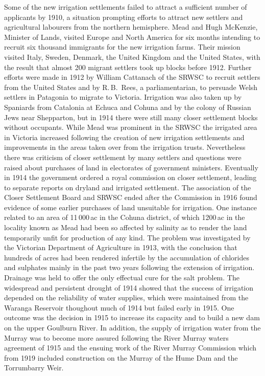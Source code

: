 Some of the new irrigation settlements failed to attract a sufficient
number of applicants by 1910, a situation prompting efforts to attract
new settlers and agricultural labourers from the northern hemisphere.
Mead and Hugh McKenzie, Minister of Lands, visited Europe and North
America for six months intending to recruit six thousand immigrants
for the new irrigation farms. Their mission visited Italy, Sweden,
Denmark, the United Kingdom and the United States, with the result
that almost 200 migrant settlers took up blocks before 1912.  Further
efforts were made in 1912 by William Cattanach of the SRWSC to recruit
settlers from the United States and by R.\,B.~Rees, a parliamentarian,
to persuade Welsh settlers in Patagonia to migrate to Victoria.
Irrigation was also taken up by Spaniards from Catalonia at Echuca and
Cohuna and by the colony of Russian Jews near Shepparton, but in 1914
there were still many closer settlement blocks without occupants.
While Mead was prominent in the SRWSC the irrigated area in Victoria
increased following the creation of new irrigation settlements and
improvements in the areas taken over from the irrigation trusts.
Nevertheless there was criticism of closer settlement by many settlers
and questions were raised about purchases of land in electorates of
government ministers.  Eventually in 1914 the government ordered a
royal commission on closer settlement, leading to separate reports on
dryland and irrigated settlement.  The association of the Closer
Settlement Board and SRWSC ended after the Commission in 1916 found
evidence of some earlier purchases of land unsuitable for irrigation.
One instance related to an area of 11\,000\,ac in the Cohuna district,
of which 1200\,ac in the locality known as Mead had been so affected
by salinity as to render the land temporarily unfit for production of
any kind.  The problem was investigated by the Victorian Department of
Agriculture in 1913, with the conclusion that hundreds of acres had
been rendered infertile by the accumulation of chlorides and sulphates
mainly in the past two years following the extension of irrigation.
Drainage was held to offer the only effectual cure for the salt
problem.  The widespread and persistent drought of 1914 showed that
the success of irrigation depended on the reliability of water
supplies, which were maintained from the Waranga Reservoir thoughout
much of 1914 but failed early in 1915.  One outcome was the decision
in 1915 to increase its capacity and to build a new dam on the upper
Goulburn River.  In addition, the supply of irrigation water from the
Murray was to become more assured following the River Murray waters
agreement of 1915 and the ensuing work of the River Murray Commission
which from 1919 included construction on the Murray of the Hume Dam
and the Torrumbarry Weir.

